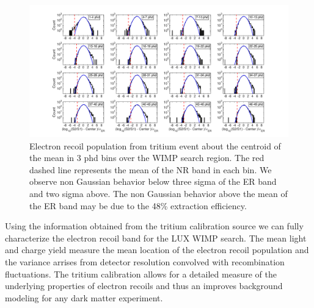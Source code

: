 \onecolumngrid
\break
\begin{figure}\centering
\includegraphics[width=220mm]{fig/Gaussianity/GaussER_all.png}
\caption{Electron recoil population from tritium event about the centroid of the mean in 3 phd bins over the WIMP search region. The red dashed line represents the mean of the NR band in each bin. We observe non Gaussian behavior below three sigma of the ER band and two sigma above. The non Gaussian behavior above the mean of the ER band may be due to the 48\% extraction efficiency.  }
\label{fig:ER-Gauss}
\end{figure}
\twocolumngrid

Using the information obtained from the tritium calibration source we can fully characterize the electron recoil band for the LUX WIMP search. The mean light and charge yield measure the mean location of the electron recoil population and the variance arrises from detector resolution convolved with recombination fluctuations. The tritium calibration allows for a detailed measure of the underlying properties of electron recoils and thus an improves background modeling for any dark matter experiment.

